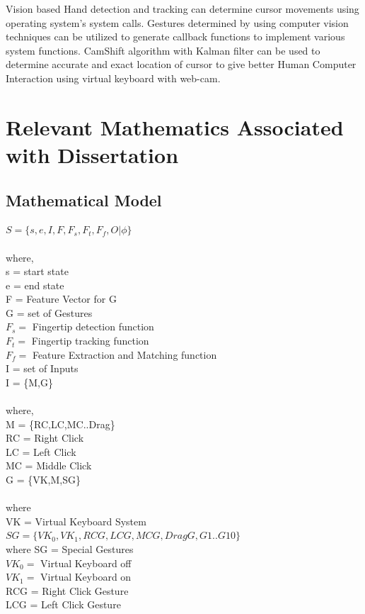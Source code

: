 \documentclass[oneside,a4paper,12pt]{pictreport}
\begin{document}
Vision based Hand detection and tracking can determine cursor movements using operating system's system calls. Gestures determined by using computer vision techniques can be utilized to generate callback functions to implement various system functions. CamShift algorithm with Kalman filter can be used to determine accurate and exact location of cursor to give better Human Computer Interaction using virtual keyboard with web-cam.

\section{Relevant Mathematics Associated with Dissertation}

\subsection{Mathematical Model}
$S=\{s,e,I,F,F_{s},F_{t},F_{f},O|\phi\}$\\\\
where,\\
s = start state\\
e = end state\\
F = Feature Vector for G\\
G = set of Gestures\\
$F_{s} =$ Fingertip detection function\\
$F_{t} =$ Fingertip tracking function\\
$F_{f} =$ Feature Extraction and Matching function\\
I = set of Inputs\\
I = \{M,G\}\\\\
where,\\
M = \{RC,LC,MC..Drag\}\\
RC = Right Click\\
LC = Left Click\\
MC = Middle Click\\
G = \{VK,M,SG\}\\\\
where\\
VK = Virtual Keyboard System\\
$SG = \{VK_{0},VK_{1},RCG,LCG,MCG,DragG,G1..G10\}$\\
where
SG  = Special Gestures\\
$VK_{0} =$ Virtual Keyboard off\\
$VK_{1} =$ Virtual Keyboard on\\
RCG = Right Click Gesture\\
LCG = Left Click Gesture\\
\end{document}
